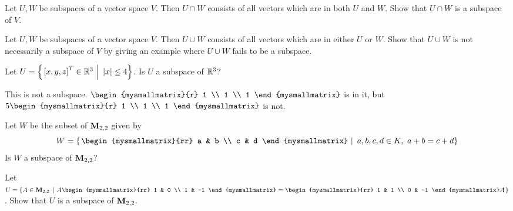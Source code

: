 \begin{ex}
  Let $U,W$ be subspaces of a vector space $V$. Then $U\cap W$ consists
  of all vectors which are in both $U$ and $W$. Show that $U\cap W$ is a
  subspace of $V$.
\end{ex}

\begin{ex}
  Let $U,W$ be subspaces of a vector space $V$. Then $U\cup W$
  consists of all vectors which are in either $U$ or $W$. Show that
  $U\cup W$ is not necessarily a subspace of $V$ by giving an example
  where $U\cup W$ fails to be a subspace.
\end{ex}

\begin{ex}
  Let $U=\left\{\left.\left[x,y,z\right]^T \in \mathbb{R}^{3}~\right\vert~\left|x\right| \leq 4\right\}$. Is $U$ a
  subspace of $\mathbb{R}^3$?
  \begin{sol}
    This is not a subspace.
    $\begin{mysmallmatrix}{r} 1 \\ 1 \\ 1 \end{mysmallmatrix}$ is in it, but
    $5\begin{mysmallmatrix}{r} 1 \\ 1 \\ 1 \end{mysmallmatrix} $ is not.
  \end{sol}
\end{ex}

\begin{ex}
  Let $W$ be the subset of\/ $\mathbf{M}_{2,2}$ given by
  \begin{equation*}
    W = \set{\left.\begin{mysmallmatrix}{rr}
        a  & b \\
        c & d
      \end{mysmallmatrix}~\right\vert~ a,b,c,d \in K,~ a + b = c + d }
  \end{equation*}
  Is $W$ a subspace of $\mathbf{M}_{2,2}$?
\end{ex}

\begin{ex}
  Let $U=\set{
    A\in\Mat_{2,2}
    ~\left\vert~
      A\begin{mysmallmatrix}{rr} 1 & 0 \\ 1 & -1 \end{mysmallmatrix}
      = \begin{mysmallmatrix}{rr} 1 & 1 \\ 0 & -1 \end{mysmallmatrix} A
    \right.}$.
  Show that $U$ is a subspace of $\mathbf{M}_{2,2}$.
\end{ex}

